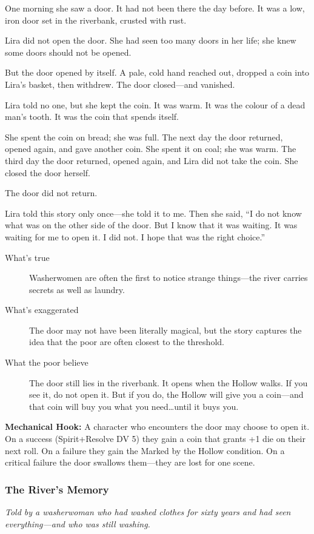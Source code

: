 \documentclass[11pt]{article}
\begin{document}
One morning she saw a door. It had not been there the day before. It was a low, iron door set in the riverbank, crusted with rust.

Lira did not open the door. She had seen too many doors in her life; she knew some doors should not be opened.

But the door opened by itself. A pale, cold hand reached out, dropped a coin into Lira’s basket, then withdrew. The door closed—and vanished.

Lira told no one, but she kept the coin. It was warm. It was the colour of a dead man's tooth. It was the coin that spends itself.

She spent the coin on bread; she was full. The next day the door returned, opened again, and gave another coin. She spent it on coal; she was warm. The third day the door returned, opened again, and Lira did not take the coin. She closed the door herself.

The door did not return.

Lira told this story only once—she told it to me. Then she said, “I do not know what was on the other side of the door. But I know that it was waiting. It was waiting for me to open it. I did not. I hope that was the right choice.”

\begin{description}
\item[What's true] Washerwomen are often the first to notice strange things—the river carries secrets as well as laundry.
\item[What's exaggerated] The door may not have been literally magical, but the story captures the idea that the poor are often closest to the threshold.
\item[What the poor believe] The door still lies in the riverbank. It opens when the Hollow walks. If you see it, do not open it. But if you do, the Hollow will give you a coin—and that coin will buy you what you need…until it buys you.
\end{description}

\textbf{Mechanical Hook:} A character who encounters the door may choose to open it. On a success (Spirit+Resolve DV 5) they gain a coin that grants +1 die on their next roll. On a failure they gain the Marked by the Hollow condition. On a critical failure the door swallows them—they are lost for one scene.

\subsubsection{The River's Memory}
\textit{Told by a washerwoman who had washed clothes for sixty years and had seen everything—and who was still washing.}
\end{document}

